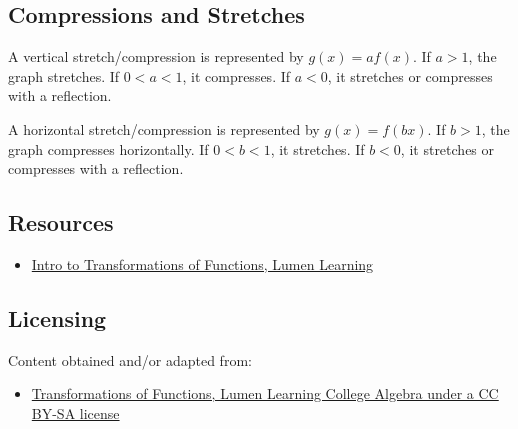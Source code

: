 \subsection{Compressions and Stretches}
\label{sss:comp-67a5}

A vertical stretch/compression is represented by $g(x) = af(x)$. If $a > 1$, the graph stretches. If $0 < a < 1$, it compresses. If $a < 0$, it stretches or compresses with a reflection.

A horizontal stretch/compression is represented by $g(x) = f(bx)$. If $b > 1$, the graph compresses horizontally. If $0 < b < 1$, it stretches. If $b < 0$, it stretches or compresses with a reflection.

\subsection{Resources}
\label{sss:reso-55b5}

\begin{itemize}
    \item \href{https://courses.lumenlearning.com/wmopen-collegealgebra/chapter/introduction-transformations-of-functions/}{Intro to Transformations of Functions, Lumen Learning}
\end{itemize}

\subsection{Licensing}
\label{sss:lice-7352}

Content obtained and/or adapted from:

\begin{itemize}
    \item \href{https://courses.lumenlearning.com/wmopen-collegealgebra/chapter/introduction-transformations-of-functions/}{Transformations of Functions, Lumen Learning College Algebra under a CC BY-SA license}
\end{itemize}

